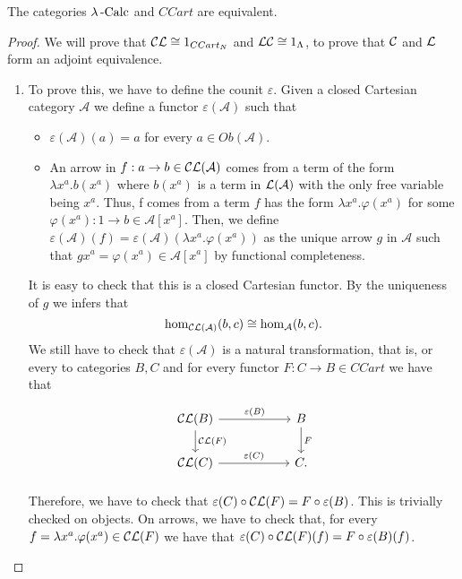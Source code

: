 \begin{theorem}The categories $\lambda\operatorname{-Calc}$ and $CCart$ are equivalent. \end{theorem}
\begin{proof}
  We will prove that $\mathcal{C} \mathcal{L} \cong 1_{CCart_N}$ and  $ \mathcal{L}\mathcal{C} \cong 1_{\Lambda}$, to prove that $\mathcal{C}$ and $\mathcal{L}$ form an adjoint equivalence.

  \begin{enumerate}
  \item[\fbox{$\CC \LL \cong 1_{\mathcal A}$}] To prove this, we have to define the counit $\varepsilon$. Given a closed Cartesian category $\mathcal A$ we define a functor  $\varepsilon(\mathcal A)$ such that
    \begin{itemize}
    \item $\varepsilon(\mathcal A)    (a) = a$ for every $a\in Ob(\mathcal A)$.
    \item An arrow in $f:a\to b \in \mathcal{C} \mathcal{L}(\mathcal A)$ comes from a term of the form $\lambda x^a. b(x^a)$ where $b(x^a)$ is a term in $\mathcal{L} (\mathcal A)$ with the only free variable being $x^a$. Thus, f comes from a term $f$ has the form $\lambda x^a. \varphi(x^a)$ for some $\varphi(x^a): 1 \to b \in \mathcal A [x^a]$. Then, we define $\varepsilon(\mathcal A)(f) = \varepsilon(\mathcal A)(\lambda x^a.\varphi(x^a))$ as the unique arrow $g$ in $\mathcal{A}$ such that $gx^a = \varphi(x^a) \in \mathcal A[x^a]$ by functional completeness.
    \end{itemize}
    It is easy to check that this is a closed Cartesian functor.  By the uniqueness of $g$ we infers that $$\operatorname{hom}_{\mathcal{C}\mathcal{L}(\mathcal A)} (b,c)\cong \operatorname{hom}_{\mathcal A} (b,c).$$
    We still have to check that $\varepsilon (\mathcal A)$ is a natural transformation, that is, or every to categories $B,C$ and  for every functor $F: C\to B\in CCart$ we have that
    \[
      \begin{tikzpicture}
        \node {\begin{tikzcd}[column sep=20mm]
            \CC\LL(B)\ar[r,"\varepsilon(B)"]\ar[d,"\CC\LL(F)"] & B\ar[d,"F"]\\
            \CC\LL(C)\ar[r,"\varepsilon(C)"] & C.
          \end{tikzcd}};
      \end{tikzpicture}
    \]

    Therefore, we have to check that $\varepsilon(C)\circ \mathcal{C}\mathcal{L}(F) = F \circ \varepsilon(B)$. This is trivially checked on objects. On arrows, we have to check that, for every $f = \lambda x^a.\varphi(x^a) \in \mathcal{C}\mathcal{L}(F) $ we have that $\varepsilon(C)\circ \mathcal{C}\mathcal{L}(F) (f)= F \circ \varepsilon(B)(f)$.


\end{enumerate}
\end{proof}
